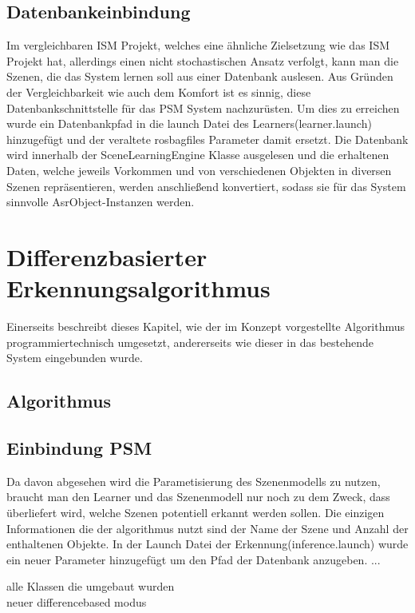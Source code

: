 \subsection{Datenbankeinbindung}
Im vergleichbaren ISM Projekt, welches eine ähnliche Zielsetzung wie das ISM Projekt hat, allerdings einen nicht stochastischen Ansatz verfolgt, kann man die Szenen, die das System lernen soll aus einer Datenbank auslesen. Aus Gründen der Vergleichbarkeit wie auch dem Komfort ist es sinnig, diese Datenbankschnittstelle für das PSM System nachzurüsten. Um dies zu erreichen wurde ein Datenbankpfad in die launch Datei des Learners(learner.launch) hinzugefügt und der veraltete rosbagfiles Parameter damit ersetzt. Die Datenbank wird innerhalb der SceneLearningEngine Klasse ausgelesen und die erhaltenen Daten, welche jeweils Vorkommen und von verschiedenen Objekten in diversen Szenen repräsentieren, werden anschließend konvertiert, sodass sie für das System sinnvolle AsrObject-Instanzen werden.\smallskip\\



\section{Differenzbasierter Erkennungsalgorithmus}
Einerseits beschreibt dieses Kapitel, wie der im Konzept vorgestellte Algorithmus programmiertechnisch umgesetzt, andererseits wie dieser in das bestehende System eingebunden wurde. 
\subsection{Algorithmus}
\subsection{Einbindung PSM}
Da davon abgesehen wird die Parametisierung des Szenenmodells zu nutzen, braucht man den Learner und das Szenenmodell nur noch zu dem Zweck, dass überliefert wird, welche Szenen potentiell erkannt werden sollen. Die einzigen Informationen die der algorithmus nutzt sind der Name der Szene und Anzahl der enthaltenen Objekte.
In der Launch Datei der Erkennung(inference.launch) wurde ein neuer Parameter hinzugefügt um den Pfad der Datenbank anzugeben. ...

alle Klassen die umgebaut wurden\\
neuer differencebased modus \\

